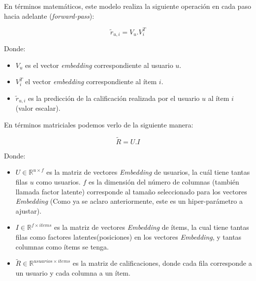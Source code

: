 \documentclass[11pt,a4paper,twoside]{thesis}
\begin{document}
\clearpage

En términos matemáticos, este modelo realiza la siguiente operación en cada
paso hacia adelante (\textit{forward-pass}):

\begin{equation}
	\tilde{r}_{u, i} = V_u . V_i^{T}
\end{equation}
\begin{description}
	\item[Donde:]
\end{description}
\begin{itemize}
	\item $V_u$ es el vector \textit{embedding} correspondiente al usuario $u$.
	\item $V_i^{T}$ el vector \textit{embedding} correspondiente al ítem $i$.
	\item $ \tilde{r}_{u, i}$ es la predicción de la calificación realizada por el usuario $u$ al ítem $i$ (valor escalar).
\end{itemize}

En términos matriciales podemos verlo de la siguiente manera:

\begin{equation}
	\tilde{R} = U.I
\end{equation}
\begin{description}
	\item[Donde:]
\end{description}
\begin{itemize}
	\item $U\in\mathbb{R}^{u \times f}$ es la matriz de vectores \textit{Embedding} de usuarios,
	      la cuál tiene tantas filas $u$ como usuarios. $f$ es la dimensión del número de columnas
	      (también llamada factor latente) corresponde al tamaño seleccionado para los vectores \textit{Embedding}
	      (Como ya se aclaro anteriormente, este es un hiper-parámetro a ajustar).
	\item $I\in\mathbb{R}^{f\times items}$ es la matriz de vectores \textit{Embedding} de ítems,
	      la cual tiene tantas filas como factores latentes(posiciones) en los vectores \textit{Embedding}, y
	      tantas columnas como ítems se tenga.
	\item $\tilde{R}\in\mathbb{R}^{usuarios \times items}$ es la matriz de calificaciones,
	      donde cada fila corresponde a un usuario y cada columna a un ítem.
\end{itemize}
\end{document}
